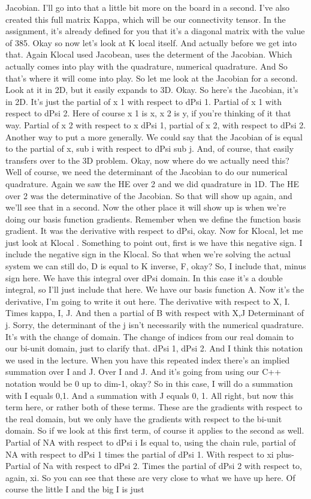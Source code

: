 \documentclass[10pt]{article}
\begin{document}
Jacobian. I'll go into that a little bit more on the board in a second. I've also created this full matrix Kappa, which will be our connectivity tensor. In the assignment, it's already defined for you that it's a diagonal matrix with the value of 385. Okay so now let's look at K local itself. And actually before we get into that. Again Klocal used Jacobean, uses the determent of the Jacobian. Which actually comes into play with the quadrature, numerical quadrature. And So that's where it will come into play. So let me look at the Jacobian for a second. Look at it in 2D, but it easily expands to 3D. Okay. So here's the Jacobian, it's in 2D. It's just the partial of x 1 with respect to dPsi 1. Partial of x 1 with respect to dPsi 2. Here of course x 1 is x, x 2 is y, if you're thinking of it that way. Partial of x 2 with respect to x dPsi 1, partial of x 2, with respect to dPsi 2. Another way to put a more generally. We could say that the Jacobian of  is equal to the partial of x, sub i with respect to dPsi sub j. And, of course, that easily transfers over to the 3D problem. Okay, now where do we actually need this? Well of course, we need the determinant of the Jacobian to do our numerical quadrature. Again we saw the HE over 2 and we did quadrature in 1D. The HE over 2 was the determinative of the Jacobian. So that will show up again, and we'll see that in a second. Now the other place it will show up is when we're doing our basis function gradients. Remember when we define the function basis gradient. It was the derivative with respect to dPsi, okay. Now for Klocal, let me just look at Klocal . Something to point out, first is we have this negative sign. I include the negative sign in the Klocal. So that when we're solving the actual system we can still do, D is equal to K inverse, F, okay? So, I include that, minus sign here. We have this integral over dPsi domain. In this case it's a double integral, so I'll just include that here. We have our basis function A. Now it's the derivative, I'm going to write it out here. The derivative with respect to X, I. Times kappa, I, J. And then a partial of B with respect with X,J Determinant of j. Sorry, the determinant of the j isn't necessarily with the numerical quadrature. It's with the change of domain. The change of indices from our real domain to our bi-unit domain, just to clarify that. dPsi 1, dPsi 2. And I think this notation we used in the lecture. When you have this repeated index there's an implied summation over I and J. Over I and J. And it's going from using our C++ notation would be 0 up to dim-1, okay? So in this case, I will do a summation with I equals 0,1. And a summation with J equals 0, 1. All right, but now this term here, or rather both of these terms. These are the gradients with respect to the real domain, but we only have the gradients with respect to the bi-unit domain. So if we look at this first term, of course it applies to the second as well. Partial of NA with respect to dPsi i Is equal to, using the chain rule, partial of NA with respect to dPsi 1 times the partial of dPsi 1. With respect to xi plus- Partial of Na with respect to dPsi 2. Times the partial of dPsi 2 with respect to, again, xi. So you can see that these are very close to what we have up here. Of course the little I and the big I is just 
\end{document}
